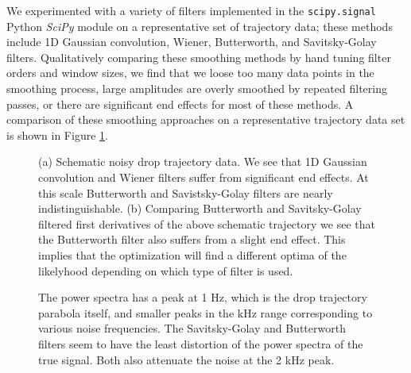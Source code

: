 \documentclass[12pt,a4paper,oneside]{book}
\begin{document}
We experimented with a variety of filters implemented in the \verb|scipy.signal| Python \emph{SciPy}\cite{oliphant_python_2007} module on a representative set of trajectory data; these methods include 1D Gaussian convolution, Wiener, Butterworth, and Savitsky-Golay filters. Qualitatively comparing these smoothing methods by hand tuning filter orders and window sizes, we find that we loose too many data points in the smoothing process, large amplitudes are overly smoothed by repeated filtering passes, or there are significant end effects for most of these methods. A comparison of these smoothing approaches on a representative trajectory data set is shown in Figure \ref{fig:y_filtered}.
\begin{figure}[htp]
    \centering
    \subfloat[]{%
}


     \subfloat[]{%
}
       \caption{(a) Schematic noisy drop trajectory data. We see that 1D Gaussian convolution and Wiener filters suffer from significant end effects. At this scale Butterworth and Savistsky-Golay filters are nearly indistinguishable. (b) Comparing Butterworth and Savitsky-Golay filtered first derivatives of the above schematic trajectory we see that the Butterworth filter also suffers from a slight end effect. This implies that the optimization will find a different optima of the likelyhood depending on which type of filter is used.}
      \label{fig:y_filtered}
\end{figure}
%    
\begin{figure}
    \centering
    
    \caption{The power spectra has a peak at 1 Hz, which is the drop trajectory parabola itself, and smaller peaks in the kHz range corresponding to various noise frequencies. The Savitsky-Golay and Butterworth filters seem to have the least distortion of the power spectra of the true signal. Both also attenuate the noise at the 2 kHz peak. \label{fig:power}}
\end{figure}
\end{document}
